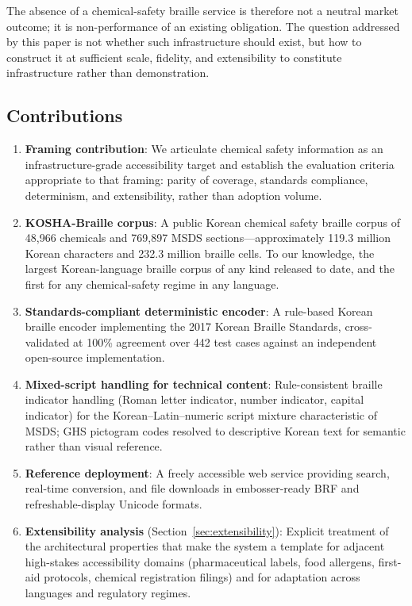 \documentclass[journal]{IEEEtran}
\begin{document}
The absence of a chemical-safety braille service is therefore not a neutral market outcome; it is non-performance of an existing obligation. The question addressed by this paper is not whether such infrastructure should exist, but how to construct it at sufficient scale, fidelity, and extensibility to constitute infrastructure rather than demonstration.

\subsection{Contributions}

\begin{enumerate}
\item \textbf{Framing contribution}: We articulate chemical safety information as an infrastructure-grade accessibility target and establish the evaluation criteria appropriate to that framing: parity of coverage, standards compliance, determinism, and extensibility, rather than adoption volume.

\item \textbf{KOSHA-Braille corpus}: A public Korean chemical safety braille corpus of 48,966 chemicals and 769,897 MSDS sections---approximately 119.3 million Korean characters and 232.3 million braille cells. To our knowledge, the largest Korean-language braille corpus of any kind released to date, and the first for any chemical-safety regime in any language.

\item \textbf{Standards-compliant deterministic encoder}: A rule-based Korean braille encoder implementing the 2017 Korean Braille Standards, cross-validated at 100\% agreement over 442 test cases against an independent open-source implementation.

\item \textbf{Mixed-script handling for technical content}: Rule-consistent braille indicator handling (Roman letter indicator, number indicator, capital indicator) for the Korean--Latin--numeric script mixture characteristic of MSDS; GHS pictogram codes resolved to descriptive Korean text for semantic rather than visual reference.

\item \textbf{Reference deployment}: A freely accessible web service providing search, real-time conversion, and file downloads in embosser-ready BRF and refreshable-display Unicode formats.

\item \textbf{Extensibility analysis} (Section~\ref{sec:extensibility}): Explicit treatment of the architectural properties that make the system a template for adjacent high-stakes accessibility domains (pharmaceutical labels, food allergens, first-aid protocols, chemical registration filings) and for adaptation across languages and regulatory regimes.
\end{enumerate}
\end{document}
